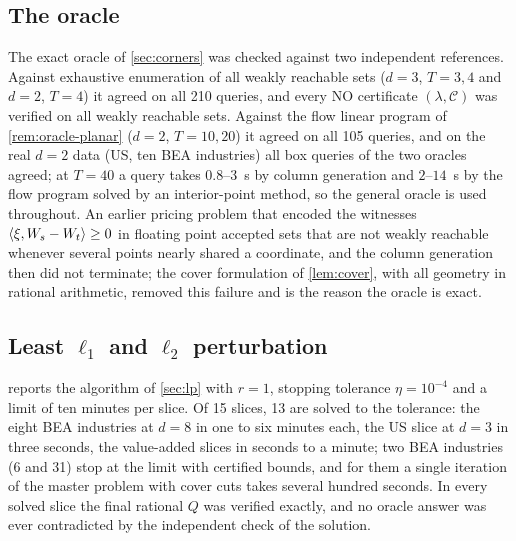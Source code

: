\subsection{The oracle}
The exact oracle of \cref{sec:corners} was checked against two independent references. Against exhaustive enumeration of all weakly reachable sets ($d=3$, $T=3,4$ and $d=2$, $T=4$) it agreed on all 210 queries, and every NO certificate $(\lambda,\mathcal C)$ was verified on all weakly reachable sets. Against the flow linear program of \cref{rem:oracle-planar} ($d=2$, $T=10,20$) it agreed on all 105 queries, and on the real $d=2$ data (US, ten BEA industries) all box queries of the two oracles agreed; at $T=40$ a query takes $0.8$--$3$~s by column generation and $2$--$14$~s by the flow program solved by an interior-point method, so the general oracle is used throughout. An earlier pricing problem that encoded the witnesses $\langle \xi, W_s-W_t\rangle\ge0$ in floating point accepted sets that are not weakly reachable whenever several points nearly shared a coordinate, and the column generation then did not terminate; the cover formulation of \cref{lem:cover}, with all geometry in rational arithmetic, removed this failure and is the reason the oracle is exact.

\subsection{Least \texorpdfstring{$\ell_1$}{l1} and \texorpdfstring{$\ell_2$}{l2} perturbation}
 reports the algorithm of \cref{sec:lp} with $r=1$, stopping tolerance $\eta=10^{-4}$ and a limit of ten minutes per slice. Of 15 slices, 13 are solved to the tolerance: the eight BEA industries at $d=8$ in one to six minutes each, the US slice at $d=3$ in three seconds, the value-added slices in seconds to a minute; two BEA industries (6 and 31) stop at the limit with certified bounds, and for them a single iteration of the master problem with cover cuts takes several hundred seconds. In every solved slice the final rational $Q$ was verified exactly, and no oracle answer was ever contradicted by the independent check of the solution.


